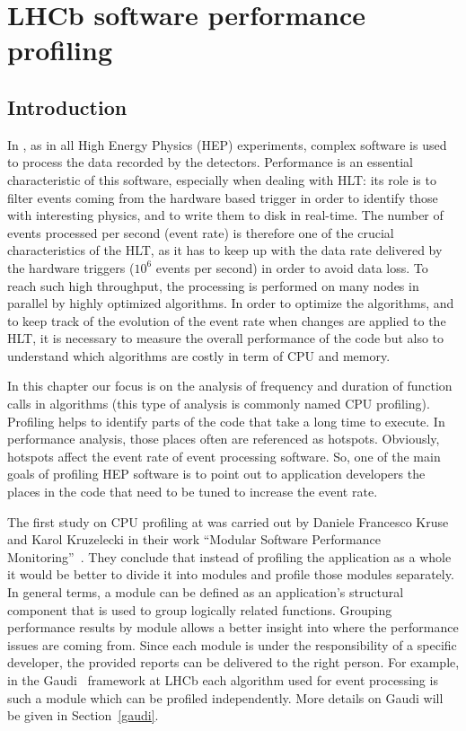 \chapter{LHCb software performance profiling}
\section{Introduction}

In \lhcb, as in all High Energy Physics (HEP) experiments, complex software is
used to process the data recorded by the detectors. Performance is an essential
characteristic of this software, especially when dealing with HLT: its role is
to filter events coming from the hardware based trigger in order to identify
those with interesting physics, and to write them to disk in real-time. The
number of events processed per second (event rate) is therefore one of the
crucial characteristics of the HLT, as it has to keep up with the data rate
delivered by the hardware triggers ($10^6$ events per second) in order to avoid
data loss. To reach such high throughput, the processing is performed on many
nodes in parallel by highly optimized algorithms. In order to optimize the
algorithms, and to keep track of the evolution of the event rate when changes
are applied to the HLT, it is necessary to measure the overall performance of
the code but also to understand which algorithms are costly in term of CPU and
memory.

In this chapter our focus is on the analysis of frequency and duration of
function calls in algorithms (this type of analysis is commonly named CPU
profiling). Profiling helps to identify parts of the code that take a long time
to execute. In performance analysis, those places often are referenced as
hotspots. Obviously,  hotspots affect the event rate of event processing
software. So, one of the main goals of profiling HEP software is to point out
to application developers the places in the code that need to be tuned to
increase the event rate.

The first study on CPU profiling at \lhcb was carried out by Daniele Francesco
Kruse and Karol Kruzelecki in their work ``Modular Software Performance
Monitoring''~\cite{modular}. They conclude that instead of profiling the
application as a whole it would be better to divide it into modules and profile
those modules separately. In general terms, a module can be defined as an
application’s structural component that is used to group logically related
functions.  Grouping performance results by module allows a better insight into
where the performance issues are coming from. Since each module is under the
responsibility of a specific developer, the provided reports can be delivered
to the right person. For example, in the Gaudi~\cite{gaudi} framework at LHCb
each algorithm used for event processing is such a module which can be profiled
independently. More details on Gaudi will be given in Section~\ref{gaudi}.

